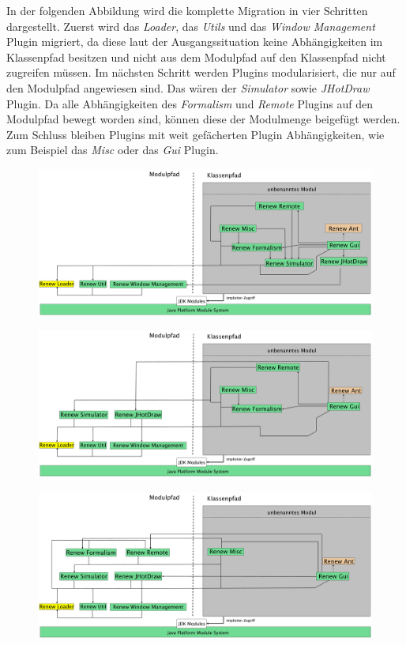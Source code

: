 	In der folgenden Abbildung wird die komplette Migration in vier Schritten dargestellt. Zuerst wird das \textit{Loader}, das \textit{Utils} und das \textit{Window Management} Plugin migriert, da diese laut der Ausgangssituation keine Abhängigkeiten im Klassenpfad besitzen und nicht aus dem Modulpfad auf den Klassenpfad nicht zugreifen müssen. Im nächsten Schritt werden Plugins modularisiert, die nur auf den Modulpfad angewiesen sind. Das wären der \textit{Simulator} sowie \textit{JHotDraw} Plugin. Da alle Abhängigkeiten des \textit{Formalism} und \textit{Remote} Plugins auf den Modulpfad bewegt worden sind, können diese der Modulmenge beigefügt werden. Zum Schluss bleiben Plugins mit weit gefächerten Plugin Abhängigkeiten, wie zum Beispiel das \textit{Misc} oder das \textit{Gui} Plugin.  \bigbreak

	\begin{figure}[h!] 
	  \centering
	  \includegraphics[width=0.997\textwidth]{material/images/renew_plugin_dependencies-migrate_1b.pdf}
	 \end{figure}
	\begin{figure}[h!] 
	  \centering
	  \includegraphics[width=0.997\textwidth]{material/images/renew_plugin_dependencies-migrate_2b.pdf}
	  \end{figure}
	 \begin{figure}[h!] 
	  \centering
  	  \includegraphics[width=0.997\textwidth]{material/images/renew_plugin_dependencies-migrate_3b.pdf}
  	  \end{figure}
